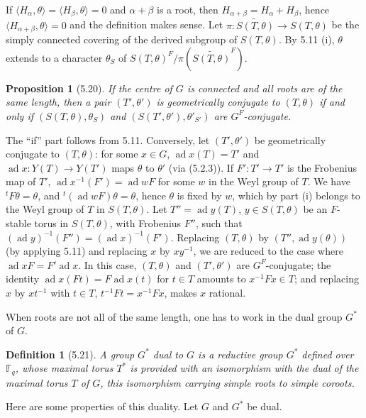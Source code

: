 \documentclass[11pt]{amsart}
\theoremstyle{plain}
\newtheorem{proposition}[theorem]{Proposition}
\newtheorem{definition}[theorem]{Definition}
\theoremstyle{remark}
\DeclareMathOperator{\ad}{ad}
\begin{document}
If $\langle H_\alpha, \theta \rangle = \langle H_\beta, \theta \rangle = 0$ and $\alpha + \beta$ is a root, then $H_{\alpha+\beta} = H_\alpha + H_\beta$, hence $\langle H_{\alpha+\beta}, \theta \rangle = 0$ and the definition makes sense. Let $\pi: \widetilde{S(T, \theta)} \to S(T, \theta)$ be the simply connected covering of the derived subgroup of $S(T, \theta)$. By 5.11 (i), $\theta$ extends to a character $\theta_S$ of $S(T, \theta)^F/\pi(\widetilde{S(T, \theta)}^F)$.

\begin{proposition}[5.20]
If the centre of $G$ is connected and all roots are of the same length, then a pair $(T', \theta')$ is geometrically conjugate to $(T, \theta)$ if and only if $(S(T, \theta), \theta_S)$ and $(S(T', \theta'), \theta'_{S'})$ are $G^F$-conjugate.
\end{proposition}

The ``if'' part follows from 5.11. Conversely, let $(T', \theta')$ be geometrically conjugate to $(T, \theta)$: for some $x \in G$, $\ad x(T) = T'$ and $\ad x: Y(T) \to Y(T')$ maps $\theta$ to $\theta'$ (via (5.2.3)). If $F': T' \to T'$ is the Frobenius map of $T'$, $\ad x^{-1}(F') = \ad wF$ for some $w$ in the Weyl group of $T$. We have ${}^tF\theta = \theta$, and ${}^t(\ad wF)\theta = \theta$, hence $\theta$ is fixed by $w$, which by part (i) belongs to the Weyl group of $T$ in $S(T, \theta)$. Let $T'' = \ad y(T)$, $y \in S(T, \theta)$ be an $F$-stable torus in $S(T, \theta)$, with Frobenius $F''$, such that $(\ad y)^{-1}(F'') = (\ad x)^{-1}(F')$. Replacing $(T, \theta)$ by $(T'', \ad y(\theta))$ (by applying 5.11) and replacing $x$ by $xy^{-1}$, we are reduced to the case where $\ad x F = F' \ad x$. In this case, $(T, \theta)$ and $(T', \theta')$ are $G^F$-conjugate; the identity $\ad x(Ft) = F\ad x(t)$ for $t \in T$ amounts to $x^{-1}Fx \in T$; and replacing $x$ by $xt^{-1}$ with $t \in T$, $t^{-1}Ft = x^{-1}Fx$, makes $x$ rational.

When roots are not all of the same length, one has to work in the dual group $G^*$ of $G$.

\begin{definition}[5.21]
A group $G^*$ dual to $G$ is a reductive group $G^*$ defined over $\mathbb{F}_q$, whose maximal torus $T^*$ is provided with an isomorphism with the dual of the maximal torus $T$ of $G$, this isomorphism carrying simple roots to simple coroots.
\end{definition}

Here are some properties of this duality. Let $G$ and $G^*$ be dual.
\end{document}
